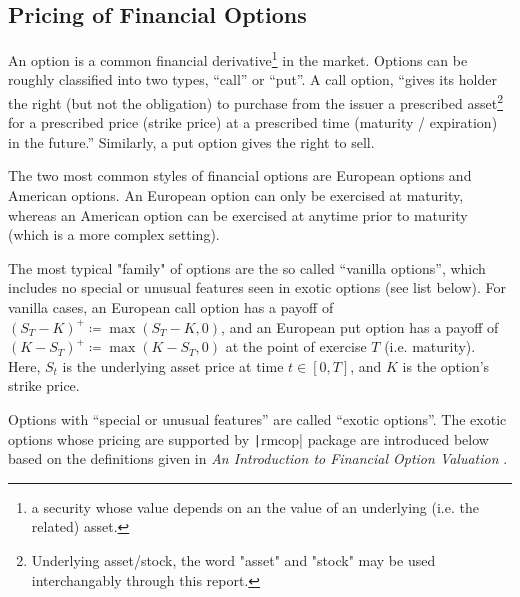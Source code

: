 \subsection{Pricing of Financial Options}

An option is a common financial derivative\footnote{a security whose value depends on an the value of an underlying (i.e. the related) asset.} in the market. Options can be roughly classified into two types, ``call'' or ``put''. A call option, ``gives its holder the right (but not the obligation) to purchase from the issuer a prescribed asset\footnote{Underlying asset/stock, the word "asset" and "stock" may be used interchangably through this report.} for a prescribed price (strike price) at a prescribed time (maturity / expiration) in the future.\cite{Higham2004}'' Similarly, a put option gives the right to sell.

The two most common styles of financial options are European options and American options. An European option can only be exercised at maturity, whereas an American option can be exercised at anytime prior to maturity (which is a more complex setting).

The most typical "family" of options are the so called ``vanilla options'', which includes no special or unusual features seen in exotic options (see list below). For vanilla cases, an European call option has a payoff of $(S_T-K)^+ \coloneqq \max{(S_T-K,0)}$, and an European put option has a payoff of $(K-S_T)^+ \coloneqq \max{(K-S_T,0)}$ \cite{Glasserman2003} at the point of exercise $T$ (i.e. maturity). Here, $S_t$ is the underlying asset price at time $t\in[0,T]$, and $K$ is the option's strike price.

Options with ``special or unusual features'' are called ``exotic options''. The exotic options whose pricing are supported by \texttt|rmcop| package are introduced below based on the definitions given in \textit{An Introduction to Financial Option Valuation} \cite{Higham2004}.

